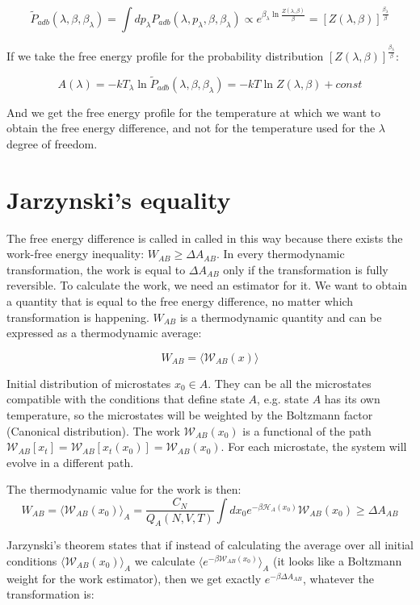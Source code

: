 	$$\tilde{P}_{adb}(\lambda, \beta, \beta_\lambda) = \int dp_\lambda P_{adb}(\lambda, p_\lambda, \beta, \beta_\lambda)\propto e^{\beta_\lambda\ln \frac{Z(\lambda, \beta)}{\beta}} = [Z(\lambda, \beta)]^{\frac{\beta_\lambda}{\beta}}$$
	
	If we take the free energy profile for the probability distribution $[Z(\lambda, \beta)]^{\frac{\beta_\lambda}{\beta}}$:

	$$A(\lambda) = -kT_\lambda\ln\tilde{P}_{adb}(\lambda, \beta, \beta_\lambda) = -kT\ln Z(\lambda, \beta) + const$$

	And we get the free energy profile for the temperature at which we want to obtain the free energy difference, and not for the temperature used for the $\lambda$ degree of freedom. 

\section{Jarzynski's equality}
The free energy difference is called in called in this way because there exists the work-free energy inequality: $W_{AB}\ge \Delta A_{AB}$.
In every thermodynamic transformation, the work is equal to $\Delta A_{AB}$ only if the transformation is fully reversible.
To calculate the work, we need an estimator for it.
We want to obtain a quantity that is equal to the free energy difference, no matter which transformation is happening.
$W_{AB}$ is a thermodynamic quantity and can be expressed as a thermodynamic average:

$$W_{AB} = \langle\mathcal{W}_{AB}(x)\rangle$$

Initial distribution of microstates $x_0\in A$.
They can be all the microstates compatible with the conditions that define state $A$, e.g. state $A$ has its own temperature, so the microstates will be weighted by the Boltzmann factor (Canonical distribution).
The work $\mathcal{W}_{AB}(x_0)$ is a functional of the path $\mathcal{W}_{AB}[x_t] = \mathcal{W}_{AB}[x_t(x_0)] = \mathcal{W}_{AB}(x_0)$.
For each microstate, the system will evolve in a different path.

The thermodynamic value for the work is then:
$$W_{AB} = \langle\mathcal{W}_{AB}(x_0)\rangle_A=\frac{C_N}{Q_A(N, V, T)}\int dx_0e^{-\beta\mathcal{H}_A(x_0)}\mathcal{W}_{AB}(x_0)\ge \Delta A_{AB}$$

Jarzynski's theorem states that if instead of calculating the average over all initial conditions $\langle\mathcal{W}_{AB}(x_0)\rangle_A$ we calculate $\langle e^{-\beta\mathcal{W}_{AB}(x_0)}\rangle_A$ (it looks like a Boltzmann weight for the work estimator), then we get exactly $e^{-\beta\Delta A_{AB}}$, whatever the transformation is:


